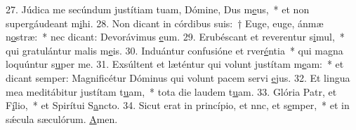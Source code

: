 27. Júdica me secúndum justítiam tuam, Dómine, Dus m\uline{e}us,~* et non supergáudeant m\uline{i}hi.
28. Non dicant in córdibus suis:~† Euge, euge, ánmæ n\uline{o}stræ:~* nec dicant: Devorávimus \uline{e}um.
29. Erubéscant et reverentur s\uline{i}mul,~* qui gratulántur malis m\uline{e}is.
30. Induántur confusióne et rver\uline{é}ntia~* qui magna loquúntur s\uline{u}per me.
31. Exsúltent et læténtur qui volunt justítam m\uline{e}am:~* et dicant semper: Magnificétur Dóminus qui volunt pacem servi \uline{e}jus.
32. Et lingua mea meditábitur justítam t\uline{u}am,~* tota die laudem t\uline{u}am.
33. Glória Patr, et F\uline{í}lio,~* et Spirítui S\uline{a}ncto.
34. Sicut erat in princípio, et nnc, et s\uline{e}mper,~* et in sǽcula sæculórum. \uline{A}men.
